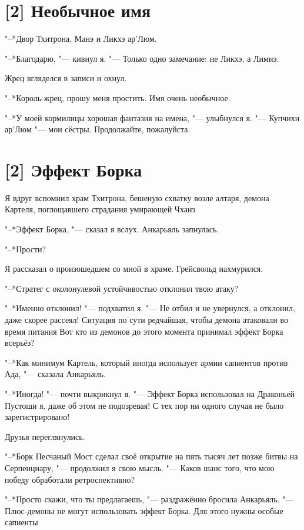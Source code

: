 \section{[2] Необычное имя}

"--*Двор Тхитрона, Манэ и Ликхэ ар'Люм.

"--*Благодарю, "--- кивнул я.
"--- Только одно замечание: не Ликхэ, а Лимнэ.

Жрец вгляделся в записи и охнул.

"--*Король-жрец, прошу меня простить.
Имя очень необычное.

"--*У моей кормилицы хорошая фантазия на имена, "--- улыбнулся я.
"--- Купчихи ар'Люм "--- мои сёстры.
Продолжайте, пожалуйста.

\section{[2] Эффект Борка}

Я вдруг вспомнил храм Тхитрона, бешеную схватку возле алтаря, демона Картеля, поглощавшего страдания умирающей Чханэ\ldotst

"--*Эффект Борка, "--- сказал я вслух.
Анкарьяль запнулась.

"--*Прости?

Я рассказал о произошедшем со мной в храме.
Грейсвольд нахмурился.

"--*Стратег с околонулевой устойчивостью отклонил твою атаку?

"--*Именно отклонил! "--- подхватил я.
"--- Не отбил и не увернулся, а отклонил, даже скорее рассеял!
Ситуация по сути редчайшая, чтобы демона атаковали во время питания\ldotst
Вот кто из демонов до этого момента принимал эффект Борка всерьёз?

"--*Как минимум Картель, который иногда использует армии сапиентов против Ада, "--- сказала Анкарьяль.

"--*Иногда! "--- почти выкрикнул я.
"--- Эффект Борка использовал на Драконьей Пустоши я, даже об этом не подозревая!
С тех пор ни одного случая не было зарегистрировано!

Друзья переглянулись.

"--*Борк Песчаный Мост сделал своё открытие на пять тысяч лет позже битвы на Серпенциару, "--- продолжил я свою мысль.
"--- Каков шанс того, что мою победу обработали ретроспективно?

"--*Просто скажи, что ты предлагаешь, "--- раздражённо бросила Анкарьяль.
"--- Плюс-демоны не могут использовать эффект Борка.
Для этого нужны особые сапиенты\ldotst

